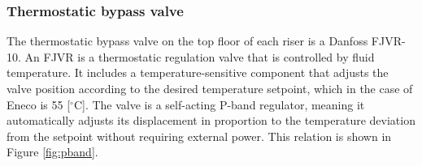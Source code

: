 
\subsubsection{Thermostatic bypass valve}\label{sec::overflowmech}
The thermostatic bypass valve on the top floor of each riser is a Danfoss FJVR-10. An FJVR is a thermostatic regulation valve that is controlled by fluid temperature. It includes a temperature-sensitive component that adjusts the valve position according to the desired temperature setpoint, which in the case of Eneco is 55 [$^{\circ}\text{C}$]. The valve is a self-acting P-band regulator, meaning it automatically adjusts its displacement in proportion to the temperature deviation from the setpoint without requiring external power. This relation is shown in Figure \ref{fig:pband}.

